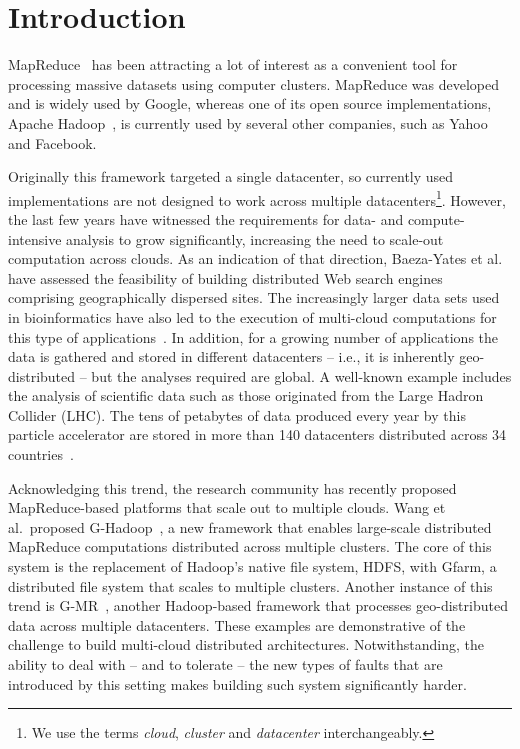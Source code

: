 \documentclass[10pt, conference, compsocconf]{IEEEtran}
\begin{document}
\section{Introduction}
\label{sec:introduction}

MapReduce~\cite{Dean:10} has been attracting a lot of interest as a convenient tool for processing massive datasets using computer clusters.
MapReduce was developed and is widely used by Google, whereas one of its open source implementations, Apache Hadoop~\cite{White:09}, is currently used by several other companies, such as Yahoo and Facebook. 

Originally this framework targeted a single datacenter, so currently used implementations are not designed to work across multiple datacenters\footnote{\small We use the terms \emph{cloud}, \emph{cluster} and \emph{datacenter} interchangeably.}.
However, the last few years have witnessed the requirements for data- and compute-intensive analysis to grow significantly, increasing the need to scale-out computation across clouds.
As an indication of that direction, Baeza-Yates et al.~\cite{Baeza-Yates:2009:FMW:1645953.1646009} have assessed the feasibility of building distributed Web search engines comprising geographically dispersed sites.
The increasingly larger data sets used in bioinformatics have also led to the execution of multi-cloud computations for this type of applications~\cite{Matsunaga09cloudblast:combining}.
In addition, for a growing number of applications the data is gathered and stored in different datacenters -- i.e., it is inherently geo-distributed -- but the analyses required are global.
A well-known example includes the analysis of scientific data such as those originated from the Large Hadron Collider (LHC).
The tens of petabytes of data produced every year by this particle accelerator are stored in more than 140 datacenters distributed across 34 countries~\cite{Brumfiel2011}.

Acknowledging this trend, the research community has recently proposed MapReduce-based platforms that scale out to multiple clouds.
Wang et al.~proposed G-Hadoop~\cite{Wang2013739}, a new framework that enables large-scale distributed MapReduce computations distributed across multiple clusters.
The core of this system is the replacement of Hadoop's native file system, HDFS, with Gfarm, a distributed file system that scales to multiple clusters.
Another instance of this trend is G-MR~\cite{JayalathSE14}, another Hadoop-based framework that processes geo-distributed data across multiple datacenters.
These examples are demonstrative of the challenge to build multi-cloud distributed architectures.
Notwithstanding, the ability to deal with -- and to tolerate -- the new types of faults that are introduced by this setting makes building such system significantly harder.
\end{document}
